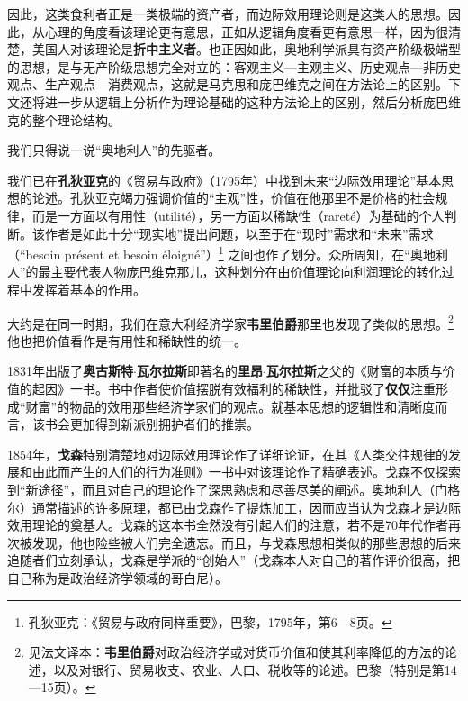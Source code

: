 \documentclass[fontset=fandol, a4paper, 12pt, openright]{ctexbook}
\begin{document}
因此，这类食利者正是一类极端的资产者，而边际效用理论则是这类人的思想。因此，从心理的角度看该理论更有意思，正如从逻辑角度看更有意思一样，因为很清楚，美国人对该理论是\textbf{折中主义者}。也正因如此，奥地利学派具有资产阶级极端型的思想，是与无产阶级思想完全对立的：客观主义—主观主义、历史观点—非历史观点、生产观点—消费观点，这就是马克思和庞巴维克之间在方法论上的区别。下文还将进一步从逻辑上分析作为理论基础的这种方法论上的区别，然后分析庞巴维克的整个理论结构。

我们只得说一说“奥地利人”的先驱者。

我们已在\textbf{孔狄亚克}的《贸易与政府》（1795年）中找到未来“边际效用理论”基本思想的论述。孔狄亚克竭力强调价值的“主观”性，价值在他那里不是价格的社会规律，而是一方面以有用性（utilit\'{e}），另一方面以稀缺性（raret\'{e}）为基础的个人判断。该作者是如此十分“现实地”提出问题，以至于在“现时”需求和“未来”需求（“besoin pr\'{e}sent et besoin \'{e}loign\'{e}”）\footnote{孔狄亚克：《贸易与政府同样重要》，巴黎，1795年，第6—8页。} 之间也作了划分。众所周知，在“奥地利人”的最主要代表人物庞巴维克那儿，这种划分在由价值理论向利润理论的转化过程中发挥着基本的作用。

大约是在同一时期，我们在意大利经济学家\textbf{韦里伯爵}那里也发现了类似的思想。\footnote{见法文译本：\textbf{韦里伯爵}对政治经济学或对货币价值和使其利率降低的方法的论述，以及对银行、贸易收支、农业、人口、税收等的论述。巴黎（特别是第14—15页）。} 他也把价值看作是有用性和稀缺性的统一。

1831年出版了\textbf{奥古斯特}$\cdot$\textbf{瓦尔拉斯}即著名的\textbf{里昂}$\cdot$\textbf{瓦尔拉斯}之父的《财富的本质与价值的起因》一书。书中作者使价值摆脱有效福利的稀缺性，并批驳了\textbf{仅仅}注重形成“财富”的物品的效用那些经济学家们的观点。就基本思想的逻辑性和清晰度而言，该书会更加得到新派别拥护者们的推崇。

1854年，\textbf{戈森}特别清楚地对边际效用理论作了详细论证，在其《人类交往规律的发展和由此而产生的人们的行为准则》一书中对该理论作了精确表述。戈森不仅探索到“新途径”，而且对自己的理论作了深思熟虑和尽善尽美的阐述。奥地利人（门格尔）通常描述的许多原理，都已由戈森作了提炼加工，因而应当认为戈森才是边际效用理论的奠基人。戈森的这本书全然没有引起人们的注意，若不是70年代作者再次被发现，他也险些被人们完全遗忘。而且，与戈森思想相类似的那些思想的后来追随者们立刻承认，戈森是学派的“创始人”（戈森本人对自己的著作评价很高，把自己称为是政治经济学领域的哥白尼）。
\end{document}
